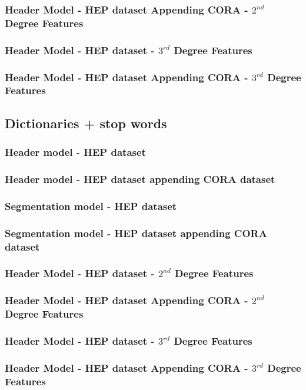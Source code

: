 \documentclass[10pt, oneside]{scrartcl}   	%
\begin{document}
\subsubsection{Header Model - HEP dataset Appending CORA - $2^{nd}$ Degree Features}
\subsubsection{Header Model - HEP dataset - $3^{rd}$ Degree Features}
\subsubsection{Header Model - HEP dataset Appending CORA - $3^{rd}$ Degree Features}
\subsection{Dictionaries + stop words}
\subsubsection{Header model - HEP dataset}
\subsubsection{Header model - HEP dataset appending CORA dataset}
\subsubsection{Segmentation model - HEP dataset}
\subsubsection{Segmentation model - HEP dataset appending CORA dataset}
\subsubsection{Header Model - HEP dataset - $2^{nd}$ Degree Features}
\subsubsection{Header Model - HEP dataset Appending CORA - $2^{nd}$ Degree Features}
\subsubsection{Header Model - HEP dataset - $3^{rd}$ Degree Features}
\subsubsection{Header Model - HEP dataset Appending CORA - $3^{rd}$ Degree Features}
\end{document}
